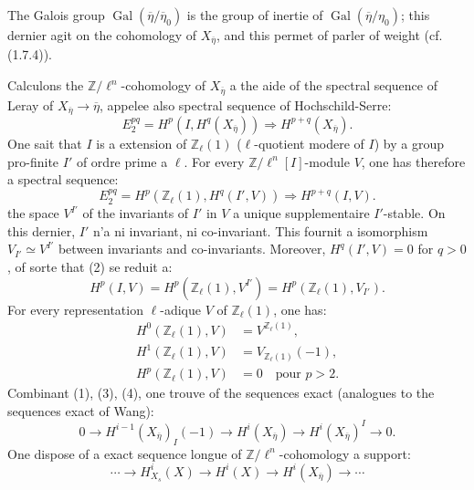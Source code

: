 \documentclass[12pt,a4paper]{article}
\theoremstyle{plain}
\theoremstyle{definition}
\theoremstyle{remark}
\DeclareMathOperator{\Gal}{Gal}
\newcommand{\ZZ}{{\mathbb{Z}}}
\begin{document}
The Galois group $\Gal(\overline{\eta}/\overline{\eta}_0)$ is the group of inertie of $\Gal(\overline{\eta}/\eta_0)$; this dernier agit on the cohomology of $X_{\overline{\eta}}$, and this permet of parler of weight (cf. (1.7.4)).

Calculons the $\ZZ/\ell^n$-cohomology of $X_{\overline{\eta}}$ a the aide of the spectral sequence of Leray of $X_{\overline{\eta}} \to \overline{\eta}$, appelee also spectral sequence of Hochschild-Serre:
\begin{equation}\label{eq:3.6.1.1}
E_2^{pq} = H^p(I, H^q(X_{\overline{\eta}})) \Rightarrow H^{p+q}(X_{\overline{\eta}}).
\end{equation}
One sait that $I$ is a extension of $\ZZ_\ell(1)$ ($\ell$-quotient modere of $I$) by a group pro-finite $I'$ of ordre prime a $\ell$. For every $\ZZ/\ell^n[I]$-module $V$, one has therefore a spectral sequence:
\begin{equation}\label{eq:3.6.1.2}
E_2^{pq} = H^p(\ZZ_\ell(1), H^q(I', V)) \Rightarrow H^{p+q}(I, V).
\end{equation}
the space $V^{I'}$ of the invariants of $I'$ in $V$ a unique supplementaire $I'$-stable. On this dernier, $I'$ n'a ni invariant, ni co-invariant. This fournit a isomorphism $V_{I'} \simeq V^{I'}$ between invariants and co-invariants. Moreover, $H^q(I', V) = 0$ for $q > 0$, of sorte that (2) se reduit a:
\begin{equation}\label{eq:3.6.1.3}
H^p(I, V) = H^p(\ZZ_\ell(1), V^{I'}) = H^p(\ZZ_\ell(1), V_{I'}).
\end{equation}
For every representation $\ell$-adique $V$ of $\ZZ_\ell(1)$, one has:
\begin{equation}\label{eq:3.6.1.4}
\begin{aligned}
H^0(\ZZ_\ell(1), V) &= V^{\ZZ_\ell(1)}, \\
H^1(\ZZ_\ell(1), V) &= V_{\ZZ_\ell(1)}(-1), \\
H^p(\ZZ_\ell(1), V) &= 0 \quad \text{pour } p > 2.
\end{aligned}
\end{equation}
Combinant (1), (3), (4), one trouve of the sequences exact (analogues to the sequences exact of Wang):
\begin{equation}\label{eq:3.6.1.5}
0 \to H^{i-1}(X_{\overline{\eta}})_I(-1) \to H^i(X_{\overline{\eta}}) \to H^i(X_{\overline{\eta}})^I \to 0.
\end{equation}
One dispose of a exact sequence longue of $\ZZ/\ell^n$-cohomology a support:
\begin{equation}\label{eq:3.6.1.6}
\cdots \to H_{X_s}^i(X) \to H^i(X) \to H^i(X_{\overline{\eta}}) \to \cdots
\end{equation}
\end{document}
